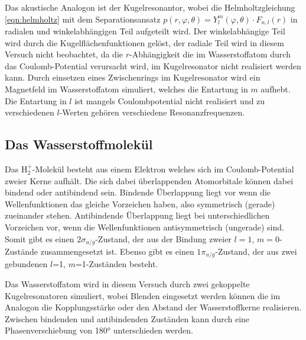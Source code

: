 \noindent
Das akustische Analogon ist der Kugelresonantor, wobei die Helmholtzgleichung \ref{eqn:helmholtz} mit dem Separationsansatz  $p(r,\varphi,\theta) = Y^m_l(\varphi,\theta) \cdot F_{n,l}(r)$ in radialen und winkelabhängigen Teil aufgeteilt wird.
Der winkelabhängige Teil wird durch die Kugelflächenfunktionen gelöst, der radiale Teil wird in diesem Versuch nicht beobachtet, da die $r$-Abhängigkeit die im Wasserstoffatom durch das Coulomb-Potential verursacht wird, im Kugelresonator nicht realisiert werden kann.
Durch einsetzen eines Zwischenrings im Kugelresonator wird ein Magnetfeld im Wasserstoffatom simuliert, welches die Entartung in $m$ aufhebt.
Die Entartung in $l$ ist mangels Coulombpotential nicht realisiert und zu verschiedenen $l$-Werten gehören verschiedene Resonanzfrequenzen.

\subsection{Das Wasserstoffmolekül}

\noindent
Das $\text{H}^+_2$-Molekül besteht aus einem Elektron welches sich im Coulomb-Potential zweier Kerne aufhält.
Die sich dabei überlappenden Atomorbitale können dabei bindend oder antibindend sein.
Bindende Überlappung liegt vor wenn die Wellenfunktionen das gleiche Vorzeichen haben, also symmetrisch (gerade) zueinander stehen.
Antibindende Überlappung liegt bei unterschiedlichen Vorzeichen vor, wenn die Wellenfunktionen antisymmetrisch (ungerade) sind.
Somit gibt es einen $2\sigma_{u/g}$-Zustand, der aus der Bindung zweier $l=1$, $m=0$-Zustände zusammengesetzt ist. Ebenso gibt es einen $1\pi_{u/g}$-Zustand, der aus zwei gebundenen $l$=1, $m$=1-Zuständen besteht.

\noindent
Das Wasserstoffatom wird in diesem Versuch durch zwei gekoppelte Kugelresonatoren simuliert, wobei Blenden eingesetzt werden können die im Analogon die Kopplungsstärke oder den Abstand der Wasserstoffkerne realisieren.
Zwischen bindenden und antibindenden Zuständen kann durch eine Phasenverschiebung von 180° unterschieden werden.

 